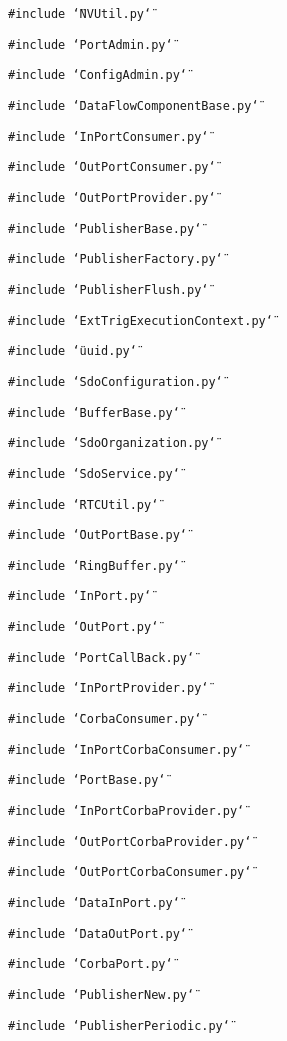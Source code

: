 {\tt \#include \char`\"{}NVUtil.py\char`\"{}}\par
{\tt \#include \char`\"{}Port\-Admin.py\char`\"{}}\par
{\tt \#include \char`\"{}Config\-Admin.py\char`\"{}}\par
{\tt \#include \char`\"{}Data\-Flow\-Component\-Base.py\char`\"{}}\par
{\tt \#include \char`\"{}In\-Port\-Consumer.py\char`\"{}}\par
{\tt \#include \char`\"{}Out\-Port\-Consumer.py\char`\"{}}\par
{\tt \#include \char`\"{}Out\-Port\-Provider.py\char`\"{}}\par
{\tt \#include \char`\"{}Publisher\-Base.py\char`\"{}}\par
{\tt \#include \char`\"{}Publisher\-Factory.py\char`\"{}}\par
{\tt \#include \char`\"{}Publisher\-Flush.py\char`\"{}}\par
{\tt \#include \char`\"{}Ext\-Trig\-Execution\-Context.py\char`\"{}}\par
{\tt \#include \char`\"{}uuid.py\char`\"{}}\par
{\tt \#include \char`\"{}Sdo\-Configuration.py\char`\"{}}\par
{\tt \#include \char`\"{}Buffer\-Base.py\char`\"{}}\par
{\tt \#include \char`\"{}Sdo\-Organization.py\char`\"{}}\par
{\tt \#include \char`\"{}Sdo\-Service.py\char`\"{}}\par
{\tt \#include \char`\"{}RTCUtil.py\char`\"{}}\par
{\tt \#include \char`\"{}Out\-Port\-Base.py\char`\"{}}\par
{\tt \#include \char`\"{}Ring\-Buffer.py\char`\"{}}\par
{\tt \#include \char`\"{}In\-Port.py\char`\"{}}\par
{\tt \#include \char`\"{}Out\-Port.py\char`\"{}}\par
{\tt \#include \char`\"{}Port\-Call\-Back.py\char`\"{}}\par
{\tt \#include \char`\"{}In\-Port\-Provider.py\char`\"{}}\par
{\tt \#include \char`\"{}Corba\-Consumer.py\char`\"{}}\par
{\tt \#include \char`\"{}In\-Port\-Corba\-Consumer.py\char`\"{}}\par
{\tt \#include \char`\"{}Port\-Base.py\char`\"{}}\par
{\tt \#include \char`\"{}In\-Port\-Corba\-Provider.py\char`\"{}}\par
{\tt \#include \char`\"{}Out\-Port\-Corba\-Provider.py\char`\"{}}\par
{\tt \#include \char`\"{}Out\-Port\-Corba\-Consumer.py\char`\"{}}\par
{\tt \#include \char`\"{}Data\-In\-Port.py\char`\"{}}\par
{\tt \#include \char`\"{}Data\-Out\-Port.py\char`\"{}}\par
{\tt \#include \char`\"{}Corba\-Port.py\char`\"{}}\par
{\tt \#include \char`\"{}Publisher\-New.py\char`\"{}}\par
{\tt \#include \char`\"{}Publisher\-Periodic.py\char`\"{}}\par
